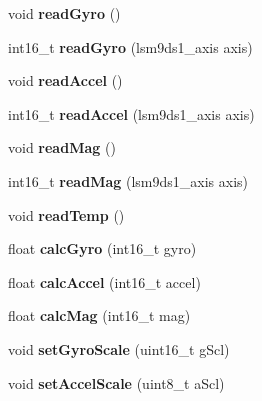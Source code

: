 \begin{DoxyCompactItemize}
\mbox{\label{classLSM9DS1_a56e9710cb538a4c7f7ab94c2ca256ce9}} 
void {\bfseries read\+Gyro} ()
\item 
\mbox{\label{classLSM9DS1_adc1b37609a6c850328b16da4f911cefd}} 
int16\+\_\+t {\bfseries read\+Gyro} (lsm9ds1\+\_\+axis axis)
\item 
\mbox{\label{classLSM9DS1_a9953684a1ff652a7d3a4d91e72bccaa1}} 
void {\bfseries read\+Accel} ()
\item 
\mbox{\label{classLSM9DS1_acbe3bfc0b8db7fe3f77893d22c394594}} 
int16\+\_\+t {\bfseries read\+Accel} (lsm9ds1\+\_\+axis axis)
\item 
\mbox{\label{classLSM9DS1_ae127cf75aa5f3c5421e49363795dcd38}} 
void {\bfseries read\+Mag} ()
\item 
\mbox{\label{classLSM9DS1_a615fd3ab32a9af833ef9899663100330}} 
int16\+\_\+t {\bfseries read\+Mag} (lsm9ds1\+\_\+axis axis)
\item 
\mbox{\label{classLSM9DS1_aca21a51dc79a1287b97ed9c326e2080b}} 
void {\bfseries read\+Temp} ()
\item 
\mbox{\label{classLSM9DS1_a76707323565bc4170ea8e27a932c95e4}} 
float {\bfseries calc\+Gyro} (int16\+\_\+t gyro)
\item 
\mbox{\label{classLSM9DS1_a54e2a7888b67b47cf0dd986c5b91a3c5}} 
float {\bfseries calc\+Accel} (int16\+\_\+t accel)
\item 
\mbox{\label{classLSM9DS1_a7d0b0740497b1a10cd3e46a282a143ec}} 
float {\bfseries calc\+Mag} (int16\+\_\+t mag)
\item 
\mbox{\label{classLSM9DS1_a115d304ebcdc8c701f3e5a5d397250aa}} 
void {\bfseries set\+Gyro\+Scale} (uint16\+\_\+t g\+Scl)
\item 
\mbox{\label{classLSM9DS1_a8656d2de1ff9cc4cb76214e4561d02c4}} 
void {\bfseries set\+Accel\+Scale} (uint8\+\_\+t a\+Scl)
\item 

\end{DoxyCompactItemize}

